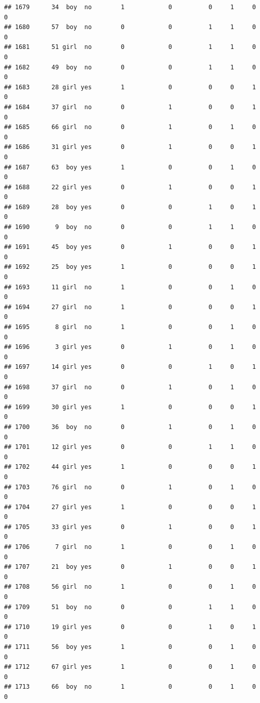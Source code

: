 \documentclass[man]{apa6}
\begin{document}
\begin{verbatim}
## 1679      34  boy  no        1            0          0     1     0     0
## 1680      57  boy  no        0            0          1     1     0     0
## 1681      51 girl  no        0            0          1     1     0     0
## 1682      49  boy  no        0            0          1     1     0     0
## 1683      28 girl yes        1            0          0     0     1     0
## 1684      37 girl  no        0            1          0     0     1     0
## 1685      66 girl  no        0            1          0     1     0     0
## 1686      31 girl yes        0            1          0     0     1     0
## 1687      63  boy yes        1            0          0     1     0     0
## 1688      22 girl yes        0            1          0     0     1     0
## 1689      28  boy yes        0            0          1     0     1     0
## 1690       9  boy  no        0            0          1     1     0     0
## 1691      45  boy yes        0            1          0     0     1     0
## 1692      25  boy yes        1            0          0     0     1     0
## 1693      11 girl  no        1            0          0     1     0     0
## 1694      27 girl  no        1            0          0     0     1     0
## 1695       8 girl  no        1            0          0     1     0     0
## 1696       3 girl yes        0            1          0     1     0     0
## 1697      14 girl yes        0            0          1     0     1     0
## 1698      37 girl  no        0            1          0     1     0     0
## 1699      30 girl yes        1            0          0     0     1     0
## 1700      36  boy  no        0            1          0     1     0     0
## 1701      12 girl yes        0            0          1     1     0     0
## 1702      44 girl yes        1            0          0     0     1     0
## 1703      76 girl  no        0            1          0     1     0     0
## 1704      27 girl yes        1            0          0     0     1     0
## 1705      33 girl yes        0            1          0     0     1     0
## 1706       7 girl  no        1            0          0     1     0     0
## 1707      21  boy yes        0            1          0     0     1     0
## 1708      56 girl  no        1            0          0     1     0     0
## 1709      51  boy  no        0            0          1     1     0     0
## 1710      19 girl yes        0            0          1     0     1     0
## 1711      56  boy yes        1            0          0     1     0     0
## 1712      67 girl yes        1            0          0     1     0     0
## 1713      66  boy  no        1            0          0     1     0     0

\end{verbatim}
\end{document}
